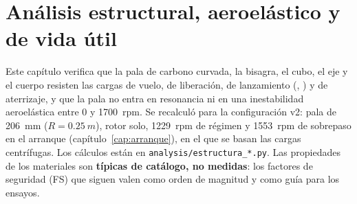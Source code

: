 \chapter{Análisis estructural, aeroelástico y de vida útil}\label{cap:estructura}

Este capítulo verifica que la pala de carbono curvada, la bisagra, el cubo, el eje y el
cuerpo resisten las cargas de vuelo, de liberación, de lanzamiento (, ) y
de aterrizaje, y que la pala no entra en resonancia ni en una inestabilidad aeroelástica
entre 0 y \SI{1700}{rpm}. Se recalculó para la configuración v2: pala de \SI{206}{mm}
($R=\SI{0.25}{m}$), rotor solo, \num{1229}~rpm de régimen y \num{1553}~rpm de sobrepaso en
el arranque (capítulo~\ref{cap:arranque}), en el que se basan las cargas centrífugas.
Los cálculos están en \texttt{analysis/estructura\_*.py}. Las
propiedades de los materiales son \textbf{típicas de catálogo, no medidas}: los factores
de seguridad (FS) que siguen valen como orden de magnitud y como guía para los ensayos.

